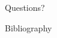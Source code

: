 \documentclass[aspectratio=169, handout]{beamer}
\begin{document}





\begin{frame}{}
      \begin{center}
    {\color{sigma@mainblue} \LARGE Questions?}
  \end{center}
\end{frame}


\begin{frame}{Bibliography}
    
    {\scriptsize }
\end{frame}
\end{document}
